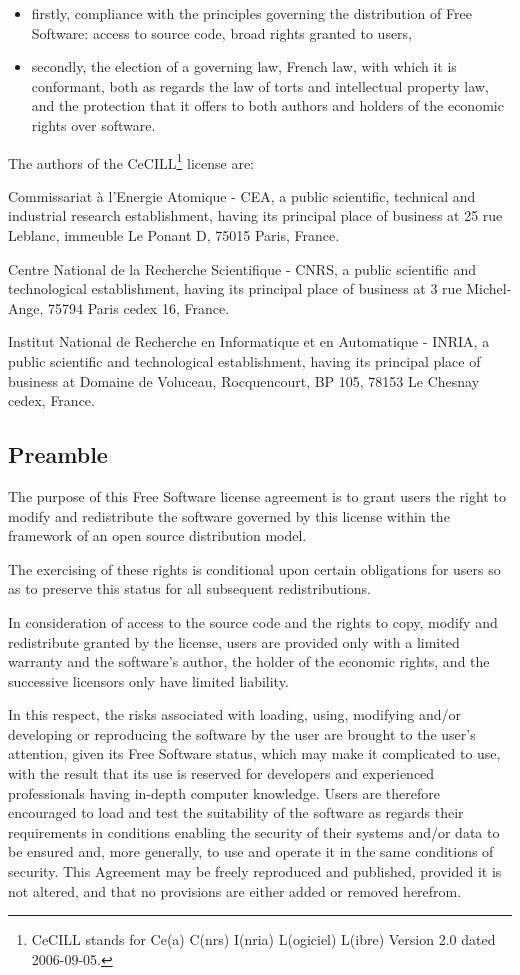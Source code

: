 \begin{itemize}
\item firstly, compliance with the principles governing the distribution of Free Software: access to source code, broad rights granted to users,
\item secondly, the election of a governing law, French law, with which it is conformant, both as regards the law of torts and intellectual property law, and the protection that it offers to both authors and holders of the economic rights over software.
\end{itemize}

The authors of the CeCILL\footnote{CeCILL stands for Ce(a) C(nrs) I(nria) L(ogiciel) L(ibre)
Version 2.0 dated 2006-09-05.} license are:

Commissariat à l'Energie Atomique - CEA, a public scientific, technical and industrial research establishment, having its principal place of business at 25 rue Leblanc, immeuble Le Ponant D, 75015 Paris, France.

Centre National de la Recherche Scientifique - CNRS, a public scientific and technological establishment, having its principal place of business at 3 rue Michel-Ange, 75794 Paris cedex 16, France.

Institut National de Recherche en Informatique et en Automatique - INRIA, a public scientific and technological establishment, having its principal place of business at Domaine de Voluceau, Rocquencourt, BP 105, 78153 Le Chesnay cedex, France.

\subsection*{Preamble}

The purpose of this Free Software license agreement is to grant users the right to modify and redistribute the software governed by this license within the framework of an open source distribution model.

The exercising of these rights is conditional upon certain obligations for users so as to preserve this status for all subsequent redistributions.

In consideration of access to the source code and the rights to copy, modify and redistribute granted by the license, users are provided only with a limited warranty and the software's author, the holder of the economic rights, and the successive licensors only have limited liability.

In this respect, the risks associated with loading, using, modifying and/or developing or reproducing the software by the user are brought to the user's attention, given its Free Software status, which may make it complicated to use, with the result that its use is reserved for developers and experienced professionals having in-depth computer knowledge. Users are therefore encouraged to load and test the suitability of the software as regards their requirements in conditions enabling the security of their systems and/or data to be ensured and, more generally, to use and operate it in the same conditions of security. This Agreement may be freely reproduced and published, provided it is not altered, and that no provisions are either added or removed herefrom.

